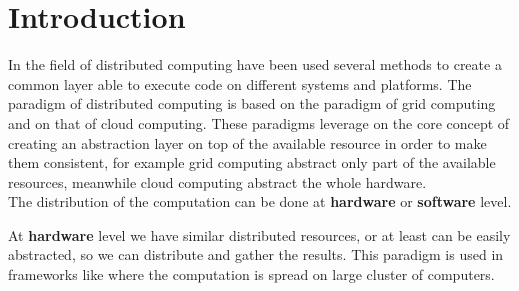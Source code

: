 \cleardoublepage
{}

\chapter*{Introduction}
\label{intro}



In the field of distributed computing have been used several methods to create a
common layer able to execute code on different systems and platforms. The paradigm
of distributed computing is based on the paradigm of grid computing and on that of
cloud computing. These paradigms leverage on the core concept of creating an abstraction
layer on top of the available resource in order to make them consistent, for example
grid computing abstract only part of the available resources, meanwhile cloud
computing abstract the whole hardware.\\

The distribution of the computation can be done at \textbf{hardware} or 
\textbf{software} level.

At \textbf{hardware} level we have similar distributed resources, or at least
can be easily abstracted, so we can distribute and gather the results. This
paradigm is used in frameworks like \cite{dean2008mapreduce} where the
computation is spread on large cluster of computers.

